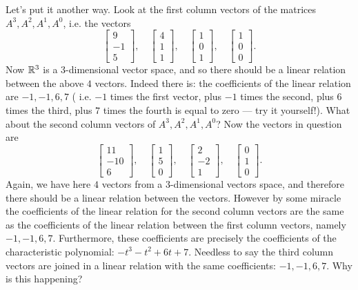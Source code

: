 \documentclass[12pt]{article}
\newcommand{\lb}{\left[}
\newcommand{\rb}{\right]}
\newcommand{\reals}{{\Bbb R}}
\newcommand{\bvector}[1]{\lb\begin{array}{r} #1 \end{array}\rb}
\begin{document}
 Let's put it another way.  Look at the first column vectors of the
 matrices $A^3, A^2, A^1, A^0$, i.e. the vectors 
 $$
 \bvector{9\\-1\\5},\quad
 \bvector{4\\1\\1},\quad
 \bvector{1\\0\\1 },\quad
 \bvector{1\\0\\0 }.
 $$
 Now $\reals^3$ is a $3$-dimensional vector space, and so there
 should be a linear relation between the above $4$ vectors.  Indeed
 there is: the coefficients of the linear relation are $-1, -1, 6, 7$
 ( i.e. $-1$ times the first vector, plus $-1$ times the second, plus
 $6$ times the third, plus $7$ times the fourth is equal to zero ---
 try it yourself!).  What about the second column vectors of $A^3,
 A^2, A^1, A^0$?  Now the vectors in question are
 $$
 \bvector{11\\-10\\6},\quad
 \bvector{1\\5\\0},\quad
 \bvector{2\\-2\\1 },\quad
 \bvector{0\\1\\0 }.
 $$
 Again, we have here $4$ vectors from a $3$-dimensional vectors
 space, and therefore there should be a linear relation between the
 vectors.  However by some miracle the coefficients of the linear
 relation for the second column vectors are the same as the
 coefficients of the linear relation between the first column vectors,
 namely $-1, -1, 6, 7$.  Furthermore, these coefficients are precisely
 the coefficients of the characteristic polynomial: $-t^3-t^2+6t+7$.
 Needless to say the third column vectors are joined in a linear
 relation with the same coefficients: $-1, -1, 6, 7$.  Why is this
 happening?
\end{document}
